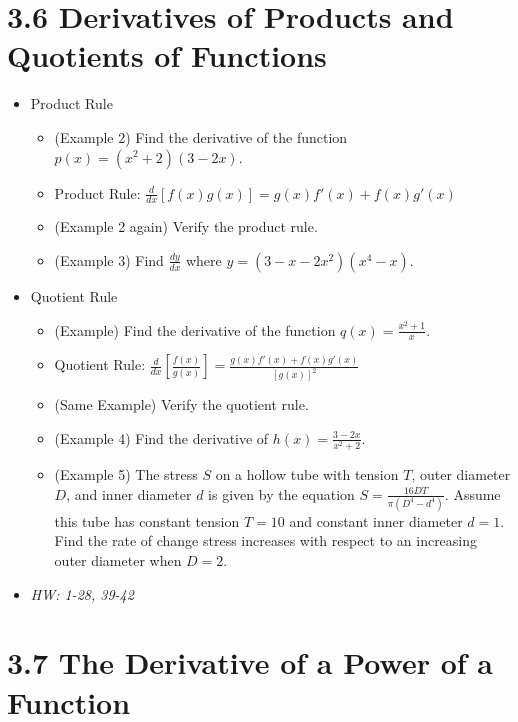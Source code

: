 \documentclass[11pt]{article}
\begin{document}
\section*{3.6 Derivatives of Products and Quotients of Functions}

\begin{itemize}
\item Product Rule
  \begin{itemize}
    \item (Example 2) Find the derivative of the function
          \(p(x)=(x^2+2)(3-2x)\).
    \item Product Rule:
          \(\frac{d}{dx}[f(x)g(x)]=g(x)f'(x)+f(x)g'(x)\)
    \item (Example 2 again) Verify the product rule.
    \item (Example 3) Find \(\frac{dy}{dx}\) where \(y=(3-x-2x^2)(x^4-x)\).
  \end{itemize}
\item Quotient Rule
  \begin{itemize}
    \item (Example) Find the derivative of the function
          \(q(x)=\frac{x^2+1}{x}\).
    \item Quotient Rule:
          \(\frac{d}{dx}[\frac{f(x)}{g(x)}]=\frac{g(x)f'(x)+f(x)g'(x)}{[g(x)]^2}\)
    \item (Same Example) Verify the quotient rule.
    \item (Example 4) Find the derivative of \(h(x)=\frac{3-2x}{x^2+2}\).
    \item (Example 5) The stress \(S\) on a hollow tube with tension \(T\),
          outer diameter \(D\), and inner diameter \(d\) is given by the
          equation \(S=\frac{16DT}{\pi(D^4-d^4)}\). Assume this tube has
          constant tension \(T=10\) and constant inner diameter \(d=1\).
          Find the rate of change
          stress increases with respect to an increasing outer diameter
          when \(D=2\).
  \end{itemize}
\item\textit{
  HW: 1-28, 39-42
}
\end{itemize}

\section*{3.7 The Derivative of a Power of a Function}
\end{document}
